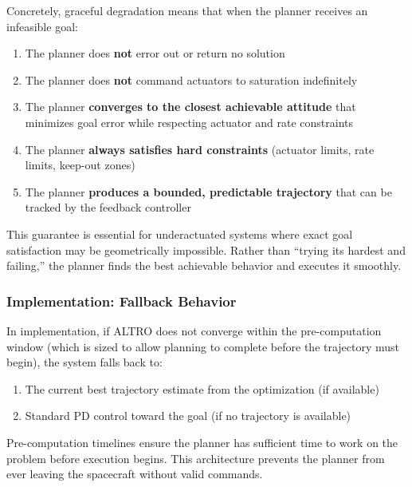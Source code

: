 \documentclass[conference]{IEEEtran}
\begin{document}
Concretely, graceful degradation means that when the planner receives an infeasible goal:
\begin{enumerate}
    \item The planner does \textbf{not} error out or return no solution
    \item The planner does \textbf{not} command actuators to saturation indefinitely
    \item The planner \textbf{converges to the closest achievable attitude} that minimizes goal error while respecting actuator and rate constraints
    \item The planner \textbf{always satisfies hard constraints} (actuator limits, rate limits, keep-out zones)
    \item The planner \textbf{produces a bounded, predictable trajectory} that can be tracked by the feedback controller
\end{enumerate}

This guarantee is essential for underactuated systems where exact goal satisfaction may be geometrically impossible. Rather than ``trying its hardest and failing,'' the planner finds the best achievable behavior and executes it smoothly.

\subsubsection{Implementation: Fallback Behavior}
In implementation, if ALTRO does not converge within the pre-computation window (which is sized to allow planning to complete before the trajectory must begin), the system falls back to:
\begin{enumerate}
    \item The current best trajectory estimate from the optimization (if available)
    \item Standard PD control toward the goal (if no trajectory is available)
\end{enumerate}
Pre-computation timelines ensure the planner has sufficient time to work on the problem before execution begins. This architecture prevents the planner from ever leaving the spacecraft without valid commands.
\end{document}
